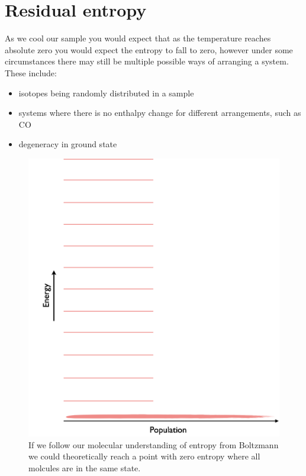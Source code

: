 \documentclass[
]{book}
\providecommand{\tightlist}{%
  \setlength{\itemsep}{0pt}\setlength{\parskip}{0pt}}
\begin{document}
\hypertarget{residual-entropy}{%
\section{Residual entropy}\label{residual-entropy}}

As we cool our sample you would expect that as the temperature reaches absolute zero you would expect the entropy to fall to zero, however under some circumstances there may still be multiple possible ways of arranging a system. These include:

\begin{itemize}
\tightlist
\item
  isotopes being randomly distributed in a sample
\item
  systems where there is no enthalpy change for different arrangements, such as CO
\item
  degeneracy in ground state
\end{itemize}

\begin{figure}

{\centering \includegraphics[width=0.8\linewidth]{images/entropyzero} 

}

\caption{If we follow our molecular understanding of entropy from Boltzmann we could theoretically reach a point with zero entropy where all molcules are in the same state.}\label{fig:entropyzero}
\end{figure}
\end{document}
